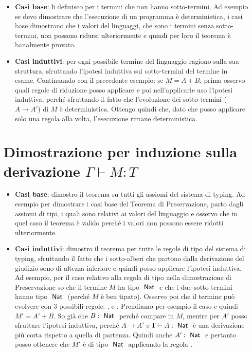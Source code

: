 \begin{itemize}
	\item \textbf{Casi base}: li definisco per i termini che non hanno sotto-termini. Ad esempio se devo dimostrare che l'esecuzione di un programma è deterministica, i casi base dimostrano che i valori del linguaggi, che sono i termini senza sotto-termini, non possono ridursi ulteriormente e quindi per loro il teorema è banalmente provato.
	\item \textbf{Casi induttivi}: per ogni possibile termine del linguaggio ragiono sulla sua struttura, sfruttando l'ipotesi induttiva sui sotto-termini del termine in esame. Continuando con il precedente esempio: se $M = A + B$, prima osservo quali regole di riduzione posso applicare e poi nell'applicarle uso l'ipotesi induttiva, perché sfruttando il fatto che l'evoluzione dei sotto-termini ($A \to A'$) di $M$ è deterministica. Ottengo quindi che, dato che posso applicare solo una regola alla volta, l'esecuzione rimane deterministica.
\end{itemize}

\section{Dimostrazione per induzione sulla derivazione $\Gamma \vdash M : T$}

\begin{itemize}
	\item \textbf{Casi base}: dimostro il teorema su tutti gli assiomi del sistema di typing. Ad esempio per dimostrare i casi base del Teorema di Preservazione, parto dagli assiomi di tipi, i quali sono relativi ai valori del linguaggio e osservo che in quel caso il teorema è valido perché i valori non possono essere ridotti ulteriormente.
	\item \textbf{Casi induttivi}: dimostro il teorema per tutte le regole di tipo del sistema di typing, sfruttando il fatto che i sotto-alberi che partono dalla derivazione del giudizio sono di altezza inferiore e quindi posso applicare l'ipotesi induttiva. Ad esempio, per il caso relativo alla regola di tipo  nella dimostrazione di Preservazione so che il termine $M$ ha tipo $\Nat$ e che i due sotto-termini hanno tipo $\Nat$ (perché $M$ è ben tipato). Osservo poi che il termine può evolvere con 3 possibili regole: ,  e . Prendiamo per esempio il caso  e quindi $M' = A' + B$. So già che $B : \Nat$ perché compare in $M$, mentre per $A'$ posso sfruttare l'ipotesi induttiva, perché $A \to A'$ e $\Gamma \vdash A : \Nat$ è una derivazione più corta rispetto a quella di partenza. Quindi anche $A' : \Nat$ e pertanto posso ottenere che $M'$ è di tipo $\Nat$ applicando la regola . 
\end{itemize}

